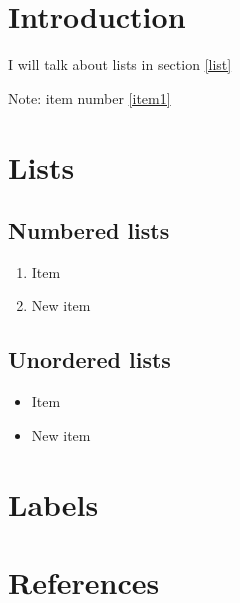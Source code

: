 \documentclass{article}
\begin{document}
\section{Introduction}
I will talk about lists in section \ref{list} 

Note: item number \ref{item1}

\section{Lists\label{list}}

\subsection{Numbered lists}
\begin{enumerate}
    \item Item \label{item1}
    \item New item
\end{enumerate}

\subsection{Unordered lists}
\begin{itemize}
    \item Item
    \item New item
\end{itemize}

\section{Labels}


\section{References}
\end{document}

